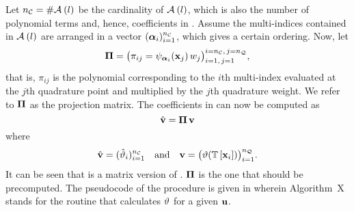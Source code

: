Let ${n_\mathcal{C}} = \# \mathcal{A}_{}\left( l \right)$ be the cardinality of $\mathcal{A}_{}\left( l \right)$, which is also the number of polynomial terms and, hence, coefficients in .
Assume the multi-indices contained in $\mathcal{A}_{}\left( l \right)$ are arranged in a vector $(\bm{\alpha}_i)_{i = 1}^{n_\mathcal{C}}$, which gives a certain ordering.
Now, let
\begin{equation} \elab{projection-matrix}
  \projection = \big( \pi_{ij} = \polynomial_{\multiindex_i}(\point_j) \, \weight_j \big)_{i = 1, \, j = 1}^{i = \ncorder, \, j = \nqorder},
\end{equation}
that is, $\pi_{ij}$ is the polynomial corresponding to the $i$th multi-index evaluated at the $j$th quadrature point and multiplied by the $j$th quadrature weight.
We refer to $\bm{\Pi}$ as the projection matrix.
The coefficients in  can now be computed as
\begin{equation} \elab{coefficient-evaluation}
  \coefficient{\evw} = \projection \, \evw
\end{equation}
where
\begin{equation} \elab{quantity-evaluation}
  \coefficient{\evw} = (\coefficient{\w}_i)_{i = 1}^\ncorder \hspace{1em} \text{and} \hspace{1em} \evw = \big(\w(\transformation{\point_i}) \big)_{i = 1}^\nqorder.
\end{equation}
It can be seen that  is a matrix version of .
$\bm{\Pi}$ is the one that should be precomputed.
The pseudocode of the procedure is given in  wherein Algorithm~X stands for the routine that calculates $\vartheta$ for a given $\mathbf{u}$.

